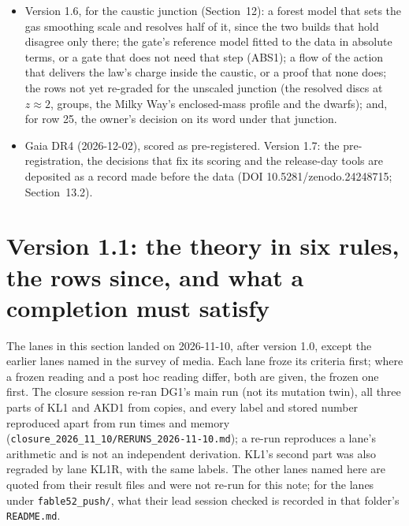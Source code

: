 \documentclass[10pt]{article}
\begin{document}
\begin{itemize}
\item Version 1.6, for the caustic junction (Section~12): a forest model that sets the gas smoothing scale and resolves half of it, since the two builds that hold disagree only there; the gate's reference model fitted to the data in absolute terms, or a gate that does not need that step (ABS1); a flow of the action that delivers the law's charge inside the caustic, or a proof that none does; the rows not yet re-graded for the unscaled junction (the resolved discs at $z\approx2$, groups, the Milky Way's enclosed-mass profile and the dwarfs); and, for row 25, the owner's decision on its word under that junction.
\item Gaia DR4 (2026-12-02), scored as pre-registered. Version 1.7: the pre-registration, the decisions that fix its scoring and the release-day tools are deposited as a record made before the data (DOI 10.5281/zenodo.24248715; Section~13.2).
\end{itemize}

\section{Version 1.1: the theory in six rules, the rows since, and what a completion must satisfy}
The lanes in this section landed on 2026-11-10, after version 1.0, except the earlier lanes named in the survey of media. Each lane froze its criteria first; where a frozen reading and a post hoc reading differ, both are given, the frozen one first. The closure session re-ran DG1's main run (not its mutation twin), all three parts of KL1 and AKD1 from copies, and every label and stored number reproduced apart from run times and memory (\texttt{closure\_2026\_11\_10/RERUNS\_2026-11-10.md}); a re-run reproduces a lane's arithmetic and is not an independent derivation. KL1's second part was also regraded by lane KL1R, with the same labels. The other lanes named here are quoted from their result files and were not re-run for this note; for the lanes under \texttt{fable52\_push/}, what their lead session checked is recorded in that folder's \texttt{README.md}.
\end{document}
